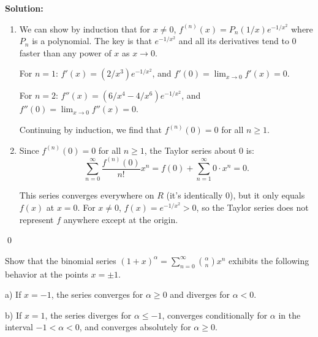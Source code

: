 \bigskip\noindent\textbf{Solution:}
\begin{enumerate}[label=(\alph*)]
\item We can show by induction that for \( x \neq 0 \), \( f^{(n)}(x) = P_n(1/x)e^{-1/x^2} \) where \( P_n \) is a polynomial. The key is that \( e^{-1/x^2} \) and all its derivatives tend to 0 faster than any power of \( x \) as \( x \to 0 \).

For \( n = 1 \): \( f'(x) = (2/x^3)e^{-1/x^2} \), and \( f'(0) = \lim_{x \to 0} f'(x) = 0 \).

For \( n = 2 \): \( f''(x) = (6/x^4 - 4/x^6)e^{-1/x^2} \), and \( f''(0) = \lim_{x \to 0} f''(x) = 0 \).

Continuing by induction, we find that \( f^{(n)}(0) = 0 \) for all \( n \geq 1 \).

\item Since \( f^{(n)}(0) = 0 \) for all \( n \geq 1 \), the Taylor series about 0 is:
\[\sum_{n=0}^{\infty} \frac{f^{(n)}(0)}{n!}x^n = f(0) + \sum_{n=1}^{\infty} 0 \cdot x^n = 0.\]

This series converges everywhere on \( R \) (it's identically 0), but it only equals \( f(x) \) at \( x = 0 \). For \( x \neq 0 \), \( f(x) = e^{-1/x^2} > 0 \), so the Taylor series does not represent \( f \) anywhere except at the origin.
\end{enumerate}\qed


\begin{problembox}
Show that the binomial series \( (1 + x)^\alpha = \sum_{n=0}^\infty \binom{\alpha}{n} x^n \) exhibits the following behavior at the points \( x = \pm 1 \).

a) If \( x = -1 \), the series converges for \( \alpha \geq 0 \) and diverges for \( \alpha < 0 \).

b) If \( x = 1 \), the series diverges for \( \alpha \leq -1 \), converges conditionally for \( \alpha \) in the interval \(-1 < \alpha < 0 \), and converges absolutely for \( \alpha \geq 0 \).
\end{problembox}

